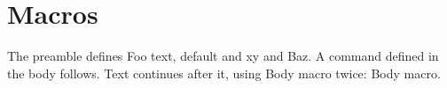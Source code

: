 \documentclass{article}
\def\foo{Foo text}
\newcommand*{\bar}[2][default]{#1 and #2}
\renewcommand\baz{Baz}
\begin{document}
\section{Macros}
The preamble defines \foo, \bar{x}{y} and \baz. A command defined in the body follows.
\newcommand{\inbody}{Body macro}
Text continues after it, using \inbody{} twice: \inbody.
\end{document}
